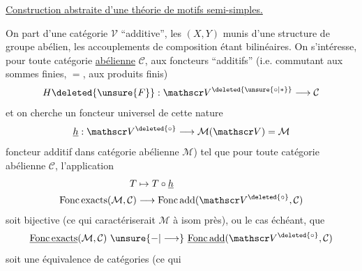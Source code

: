 \uline{Construction abstraite d'une théorie de motifs semi-simples.}

On part d'une catégorie $\mathscr V$ ``additive'',  les $(X,Y)$  munis d'une structure de groupe abélien, les accouplements de composition étant bilinéaires.  On s'intéresse, pour toute catégorie \uline{abélienne} $\mathcal C$, aux foncteurs  ``additifs'' (i.e. commutant aux sommes finies,  $=$, aux produits finis)
\[
 H\deleted{\unsure{F}}:\mathscr V^{\deleted{\unsure{\circ|*}}}\longrightarrow\mathcal C
\]
et on cherche un foncteur universel de cette nature
\[
 \underline{h}:\mathscr V^{\deleted{\circ}}\longrightarrow\mathcal M(\mathscr V)=\mathcal M
\]
foncteur additif dans catégorie abélienne $\mathcal M$) tel que pour toute catégorie abélienne $\mathcal C$, l'application
\[
\begin{aligned}
 T&\mapsto T\circ\underline h\\
 \operatorname{Fonc\,exacts}(\mathcal M,\mathcal C)&\longrightarrow\operatorname{Fonc\,add}(\mathscr V^{\deleted{\circ}},\mathcal C)
\end{aligned}
\]
soit bijective (ce qui caractériserait $\mathcal M$ à  isom près), ou le cas échéant, que
\[
 \underline{\operatorname{Fonc\,exacts}}(\mathcal M,\mathcal C)\ \unsure{\mathord{-}|\longrightarrow}\ \underline{\operatorname{Fonc\,add}}(\mathscr V^{\deleted{\circ}},\mathcal C)
\]
soit une équivalence de catégories (ce qui
